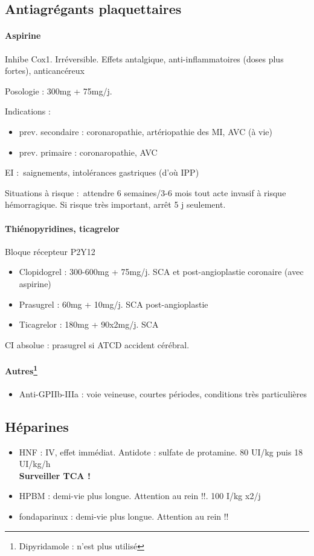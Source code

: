 \subsection{Antiagrégants plaquettaires}
\paragraph{Aspirine}
Inhibe Cox1. Irréversible. Effets antalgique, anti-inflammatoires (doses plus
fortes), anticancéreux

Posologie : 300mg + 75mg/j.

Indications : 
\begin{itemize}
  \item prev. secondaire : coronaropathie, artériopathie des MI, AVC (à
vie)
\item  prev. primaire : coronaropathie, AVC
\end{itemize}

EI : saignements, intolérances gastriques (d'où IPP)

Situations à risque : attendre 6 semaines/3-6 mois tout acte invasif à risque
hémorragique. Si risque très important, arrêt 5 j seulement.

\paragraph{Thiénopyridines, ticagrelor}
Bloque récepteur P2Y12
\begin{itemize}
  \item Clopidogrel : 300-600mg + 75mg/j. SCA et post-angioplastie coronaire
    (avec aspirine)
  \item Prasugrel : 60mg + 10mg/j. SCA post-angioplastie 
  \item Ticagrelor : 180mg + 90x2mg/j. SCA 
\end{itemize}

CI absolue : prasugrel si ATCD accident cérébral.

\paragraph{Autres\footnote{Dipyridamole : n'est plus utilisé}}
\begin{itemize}
  \item Anti-GPIIb-IIIa : voie veineuse, courtes périodes, conditions très particulières
\end{itemize}

\subsection{Héparines}%
\begin{itemize}
  \item HNF : IV, effet immédiat. Antidote : sulfate de protamine. 80 UI/kg puis
    18 UI/kg/h \\
    \textbf{Surveiller TCA !} \danger
  \item HPBM : demi-vie plus longue. Attention au rein !!. 100 I/kg x2/j
  \item fondaparinux : demi-vie plus longue. Attention au rein !!
\end{itemize}

